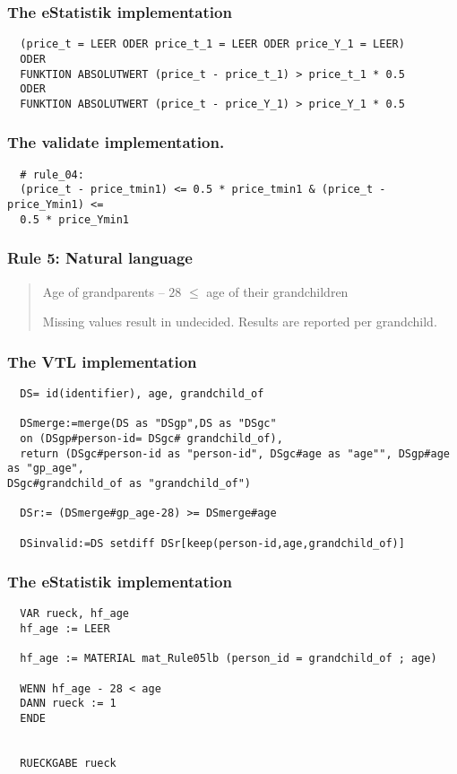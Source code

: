 \subsubsection*{The eStatistik implementation}
\begin{verbatim}
  (price_t = LEER ODER price_t_1 = LEER ODER price_Y_1 = LEER)
  ODER
  FUNKTION ABSOLUTWERT (price_t - price_t_1) > price_t_1 * 0.5
  ODER
  FUNKTION ABSOLUTWERT (price_t - price_Y_1) > price_Y_1 * 0.5
\end{verbatim}
\subsubsection*{The validate implementation.}
\begin{verbatim}
  # rule_04:
  (price_t - price_tmin1) <= 0.5 * price_tmin1 & (price_t - price_Ymin1) <=
  0.5 * price_Ymin1
\end{verbatim}


\newpage

\subsubsection*{  Rule 5: Natural language}
\begin{quote}


Age of grandparents $–$ $28$ $\leq$ age of their grandchildren

Missing values result in undecided. Results are reported per grandchild.



\end{quote}
\subsubsection*{The VTL implementation}
\begin{verbatim}
  DS= id(identifier), age, grandchild_of

  DSmerge:=merge(DS as "DSgp",DS as "DSgc"
  on (DSgp#person-id= DSgc# grandchild_of),
  return (DSgc#person-id as "person-id", DSgc#age as "age"", DSgp#age as "gp_age",
DSgc#grandchild_of as "grandchild_of")

  DSr:= (DSmerge#gp_age-28) >= DSmerge#age

  DSinvalid:=DS setdiff DSr[keep(person-id,age,grandchild_of)]

\end{verbatim}
\subsubsection*{The eStatistik implementation}
\begin{verbatim}
  VAR rueck, hf_age
  hf_age := LEER

  hf_age := MATERIAL mat_Rule05lb (person_id = grandchild_of ; age)

  WENN hf_age - 28 < age
  DANN rueck := 1
  ENDE


  RUECKGABE rueck
\end{verbatim}
